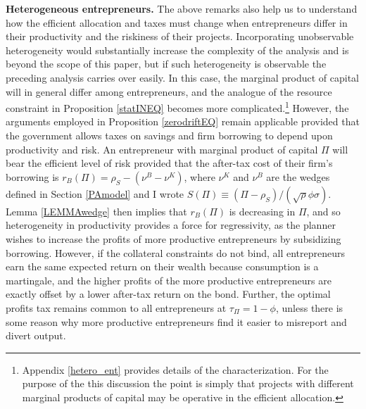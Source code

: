 \documentclass[11pt]{article}
\theoremstyle{plain}
\theoremstyle{definition} %
\begin{document}
\textbf{Heterogeneous entrepreneurs.} The above remarks also help us to understand how the efficient allocation and taxes must change when entrepreneurs differ in their productivity and the riskiness of their projects. Incorporating unobservable heterogeneity would substantially increase the complexity of the analysis and is beyond the scope of this paper, but if such heterogeneity is observable the preceding analysis carries over easily. In this case, the marginal product of capital will in general differ among entrepreneurs, and the analogue of the resource constraint in Proposition \ref{statINEQ} becomes more complicated.\footnote{Appendix \ref{hetero_ent} provides details of the characterization. For the purpose of the this discussion the point is simply that projects with different marginal products of capital may be operative in the efficient allocation.} However, the arguments employed in Proposition \ref{zerodriftEQ} remain applicable provided that the government allows taxes on savings and firm borrowing to depend upon productivity and risk. An entrepreneur with marginal product of capital $\Pi$ will bear the efficient level of risk provided that the after-tax cost of their firm's borrowing is $r_B(\Pi) = \rho_S - (\nu^B - \nu^K)$, where $\nu^K$ and $\nu^B$ are the wedges defined in Section \ref{PAmodel} and I wrote $S(\Pi) \equiv (\Pi - \rho_S)/(\sqrt{\rho}\phi\sigma)$. Lemma \ref{LEMMAwedge} then implies that $r_B(\Pi)$ is decreasing in $\Pi$, and so heterogeneity in productivity provides a force for regressivity, as the planner wishes to increase the profits of more productive entrepreneurs by subsidizing borrowing. However, if the collateral constraints do not bind, all entrepreneurs earn the same expected return on their wealth because consumption is a martingale, and the higher profits of the more productive entrepreneurs are exactly offset by a lower after-tax return on the bond. Further, the optimal profits tax remains common to all entrepreneurs at $\tau_{\Pi} = 1 - \phi$, unless there is some reason why more productive entrepreneurs find it easier to misreport and divert output.
\end{document}
